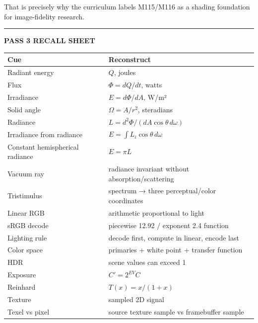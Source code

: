 That is precisely why the curriculum labels M115/M116 as a shading foundation for image-fidelity research.

\begin{center}\rule{0.5\linewidth}{0.5pt}\end{center}

\textbf{PASS 3 RECALL SHEET}

{\def\LTcaptype{none} %
\begin{longtable}[]{@{}
  >{\raggedright\arraybackslash}p{}
  >{\raggedright\arraybackslash}p{}@{}}
\toprule\noalign{}
\begin{minipage}[b]{\linewidth}\raggedright
Cue
\end{minipage} & \begin{minipage}[b]{\linewidth}\raggedright
Reconstruct
\end{minipage} \\
\midrule\noalign{}
\endhead
\bottomrule\noalign{}
\endlastfoot
Radiant energy & \(Q\), joules \\
Flux & \(\Phi=dQ/dt\), watts \\
Irradiance & \(E=d\Phi/dA\), W/m² \\
Solid angle & \(\Omega=A/r^2\), steradians \\
Radiance & \(L=d^2\Phi/(dA\cos\theta\,d\omega)\) \\
Irradiance from radiance & \(E=\int L_i\cos\theta\,d\omega\) \\
Constant hemispherical radiance & \(E=\pi L\) \\
Vacuum ray & radiance invariant without absorption/scattering \\
Tristimulus & spectrum → three perceptual/color coordinates \\
Linear RGB & arithmetic proportional to light \\
sRGB decode & piecewise 12.92 / exponent 2.4 function \\
Lighting rule & decode first, compute in linear, encode last \\
Color space & primaries + white point + transfer function \\
HDR & scene values can exceed 1 \\
Exposure & \(C'=2^{EV}C\) \\
Reinhard & \(T(x)=x/(1+x)\) \\
Texture & sampled 2D signal \\
Texel vs pixel & source texture sample vs framebuffer sample \\

\end{longtable}}
